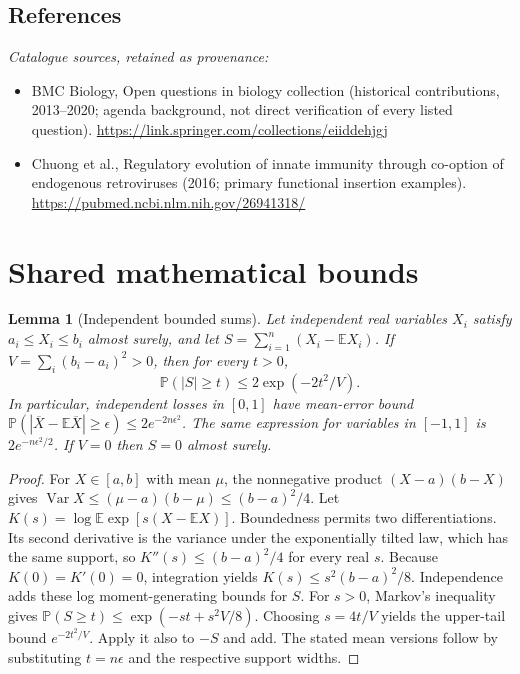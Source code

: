 \documentclass[11pt]{article}
\newcommand{\E}{\mathbb E}
\newcommand{\Prob}{\mathbb P}
\DeclareMathOperator{\Var}{Var}
\providecommand{\E}{\mathbb E}
\providecommand{\Prob}{\mathbb P}
\providecommand{\Var}{\operatorname{Var}}
\newtheorem{sharedlemma}{Lemma}[section]
\begin{document}
\subsection{References}
\noindent\emph{Catalogue sources, retained as provenance:}
\begin{itemize}
\item BMC Biology, Open questions in biology collection (historical contributions, 2013--2020; agenda background, not direct verification of every listed question). \url{https://link.springer.com/collections/eiiddehjgj}
\item Chuong et al., Regulatory evolution of innate immunity through co-option of endogenous retroviruses (2016; primary functional insertion examples). \url{https://pubmed.ncbi.nlm.nih.gov/26941318/}
\end{itemize}
\clearpage


\appendix
\section{Shared mathematical bounds}\label{app:bounds}
\begin{sharedlemma}[Independent bounded sums]\label{lem:bounded}
Let independent real variables $X_i$ satisfy $a_i\leq X_i\leq b_i$ almost surely,
and let $S=\sum_{i=1}^n(X_i-\E X_i)$. If
$V=\sum_i(b_i-a_i)^2>0$, then for every $t>0$,
\[
 \Prob(|S|\geq t)\leq 2\exp(-2t^2/V).
\]
In particular, independent losses in $[0,1]$ have mean-error bound
$\Prob(|\overline X-\E\overline X|\geq\epsilon)
\leq2e^{-2n\epsilon^2}$. The same expression for variables in $[-1,1]$
is $2e^{-n\epsilon^2/2}$. If $V=0$ then $S=0$ almost surely.
\end{sharedlemma}
\begin{proof}
For $X\in[a,b]$ with mean $\mu$, the nonnegative product
$(X-a)(b-X)$ gives
$\Var X\leq(\mu-a)(b-\mu)\leq(b-a)^2/4$.
Let $K(s)=\log\E\exp[s(X-\E X)]$.
Boundedness permits two differentiations. Its second derivative is the variance
under the exponentially tilted law, which has the same support, so
$K''(s)\leq(b-a)^2/4$ for every real $s$.
Because $K(0)=K'(0)=0$, integration yields
$K(s)\leq s^2(b-a)^2/8$.
Independence adds these log moment-generating bounds for $S$.
For $s>0$, Markov's inequality gives
$\Prob(S\geq t)\leq\exp(-st+s^2V/8)$.
Choosing $s=4t/V$ yields the upper-tail bound $e^{-2t^2/V}$.
Apply it also to $-S$ and add. The stated mean versions follow by substituting
$t=n\epsilon$ and the respective support widths.
\end{proof}
\end{document}

